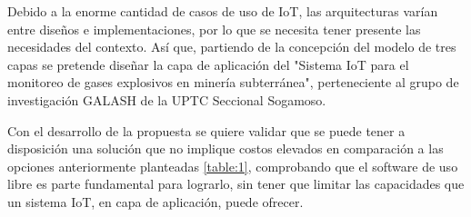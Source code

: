 \documentclass[stu,12pt,floatsintext]{apa7}
\begin{document}
		
		
		 Debido a la enorme cantidad de casos de uso de IoT, las arquitecturas varían entre diseños e implementaciones, por lo que se necesita tener presente las necesidades del contexto. Así que, partiendo de la concepción del modelo de tres capas\cite{10.1007/978-981-16-5655-2_3} se pretende diseñar la capa de aplicación del "Sistema IoT para el monitoreo de gases explosivos en minería subterránea", perteneciente al grupo de investigación GALASH de la UPTC Seccional Sogamoso.
		
		Con el desarrollo de la propuesta se quiere validar que se puede tener a disposición una solución que no implique costos elevados en comparación a las opciones anteriormente planteadas \ref{table:1}, comprobando que el software de uso libre es parte fundamental para lograrlo, sin tener que limitar las capacidades que un sistema IoT, en capa de aplicación, puede ofrecer.
	
\end{document}
